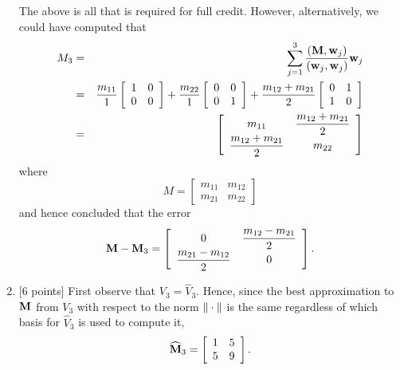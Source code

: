 \begin{solution}
\begin{enumerate}
The above is all that is required for full credit. However, alternatively, we could have computed that
\begin{eqnarray*}
M_3&=&\displaystyle{\sum_{j=1}^3{({\bf M},{\bf w}_j) \over ({\bf w}_j,{\bf w}_j)}{\bf w}_j}
\\
&=&\displaystyle{{m_{11} \over 1}\left[\begin{array}{cc}1 & 0 \\ 0 & 0\end{array}\right]+{m_{22} \over 1}\left[\begin{array}{cc}0 & 0 \\ 0 & 1\end{array}\right]+{m_{12}+m_{21} \over 2}\left[\begin{array}{cc}0 & 1 \\ 1 & 0\end{array}\right]}
\\
&=&\left[\begin{array}{cc} \displaystyle{m_{11}} & \displaystyle{\frac{m_{12}+m_{21}}{2}} \\ \displaystyle{\frac{m_{12}+m_{21}}{2}} & \displaystyle{m_{22}}\end{array}\right]
\end{eqnarray*}
 where
\[
M=\left[\begin{array}{cc} m_{11} & m_{12} \\ m_{21} & m_{22}\end{array}\right]
\]
and hence concluded that the error
\[
{\bf M}-{\bf M}_3=\left[\begin{array}{cc} \displaystyle{0} & \displaystyle{\frac{m_{12}-m_{21}}{2}} \\ \displaystyle{\frac{m_{21}-m_{12}}{2}} & \displaystyle{0}\end{array}\right].
\]


\item {[6 points]} First observe that $V_3=\widehat{V}_3$. Hence, since the best approximation to ${\bf M}$ from $V_3$ with respect to the norm $\|\cdot\|$ is the same regardless of which basis for $\widehat{V}_3$ is used to compute it,
\[
\widehat{{\bf M}}_3=\left[\begin{array}{cc}1 & 5 \\ 5 & 9\end{array}\right].
\]


\end{enumerate}
\end{solution}
